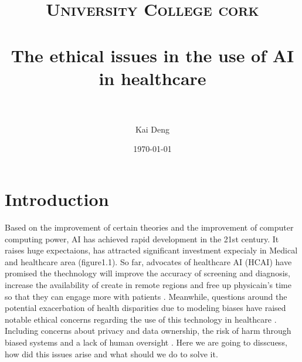 \documentclass[paper=a4, fontsize=11pt]{scrartcl} %
\title{	
\normalfont \normalsize 
\textsc{University College cork} \\ [25pt] %
\horrule{0.5pt} \\[0.4cm] %
\huge The ethical issues in the use of AI in healthcare \\ %
\horrule{2pt} \\[0.5cm] %
}
\author{Kai Deng} %
\date{\normalsize\today} %
\numberwithin{equation}{section} %
\numberwithin{figure}{section} %
\numberwithin{table}{section} %
\begin{document}
\maketitle %


\section{Introduction}






Based on the improvement of certain theories and the improvement of computer computing power,
AI has achieved rapid development in the 21st century. It raises huge expectaions, has attracted 
significant investment expecialy in Medical and healthcare area (figure1.1). So far, advocates of healthcare AI (HCAI)
have promised the thechnology will improve the accuracy of screening and diagnosis, increase the availability of create
in remote regions and free up physicain's time so that they can engage more with patients \cite{frostPublicViewsEthical2022}.
Meanwhile, questions around the potential exacerbation of health disparities due to modeling biases have raised notable ethical
concerns regarding the use of this technology in healthcare \cite{onianiAdoptingExpandingEthical2023}. Including concerns about privacy and 
data ownership, the risk of harm through biased systems and a lack of human oversight \cite{katiraiEthicsAdvancingArtificial2023}.
Here we are going to disscuess, how did this issues arise and what should we do to solve it.
\end{document}
